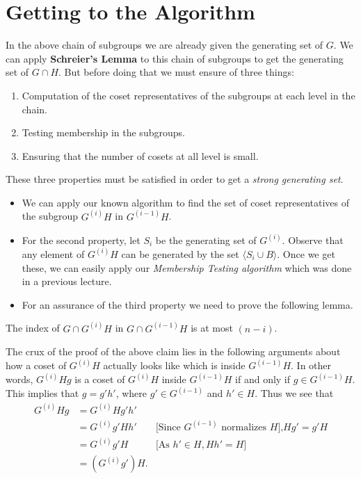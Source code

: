 \section{Getting to the Algorithm }
In the above chain of subgroups we are already given the generating set of $G$. We can apply {\bf Schreier's Lemma} to this chain of subgroups to get the generating set of $G\cap H$. But before doing that we must ensure of three things:
\begin{enumerate}
	\item Computation of the coset representatives of the subgroups at each level in the chain.
	\item Testing membership in the subgroups.
	\item Ensuring that the number of cosets at all level is small.
\end{enumerate}
These three properties must be satisfied in order to get a \emph{strong generating set}. 
\begin{itemize}
	\item We can apply our known algorithm to find the set of coset representatives of the subgroup $G^{(i)}H$ in $G^{(i-1)}H$.
	\item For the second property, let $S_i$ be the generating set of $G^{(i)}$. Observe that any element of $G^{(i)}H$ can be generated by the set $\langle S_i \cup B\rangle$. Once we get these, we can easily apply our \emph{Membership Testing algorithm} which was done in a previous lecture.
	\item For an assurance of the third property we need to prove the following lemma.
\end{itemize}
\begin{claim}\label{coset}
	The index of 
	$G\cap G^{(i)}H$ in $G\cap G^{(i-1)}H$  is at most $(n-i)$.
\end{claim}
The crux of the proof of the above claim lies in the following arguments about how a coset of $G^{(i)}H$ actually looks like which is inside $G^{(i-1)}H$. In other words, $G^{(i)}Hg$ is a coset of $G^{(i)}H$ inside $G^{(i-1)}H$ if and only if $g\in G^{(i-1)}H$. This implies that $g = g'h'$, where $g'\in G^{(i-1)}$ and $h'\in H$. Thus we see that 
\begin{eqnarray*}
	G^{(i)}Hg &= G^{(i)}Hg'h'\\
			  &= G^{(i)}g'Hh' & \text{[Since $G^{(i-1)}$ normalizes $H$],$Hg'=g'H$}\\
			  &= G^{(i)}g'H & \text{[As $h'\in H , Hh' = H$]}\\
			  &= (G^{(i)}g')H.
\end{eqnarray*}
